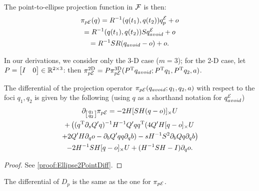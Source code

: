 \documentclass[10pt,twocolumn,twoside]{IEEEtran}
\begin{document}


The point-to-ellipse projection function in $\mathcal{F}$ is then:
  \begin{multline}\label{equ:Point2EllipseProjection}
    \pi_{p\mathcal{E}}(q)= R^{-1}(q(t_1),q(t_2))q^{\mathcal{E}}_p+o \\
    = R^{-1}(q(t_1),q(t_2))Sq^{\mathcal{E}}_{avoid}+o\\
    = R^{-1}S R ( q_{avoid}- o)+o.
  \end{multline}
  
In our derivations, we consider only the 3-D case ($m=3$); for the 2-D case, let $P=\begin{bmatrix}I & 0\end{bmatrix}\in\mathbb{R}^{2\times 3}{}$: then $\pi_{p\mathcal{E}}^{\textrm{2D}}=P\pi_{p\mathcal{E}}^{\textrm{3D}}(P^\mathrm{T} q_{avoid}; P^\mathrm{T} q_1, P^\mathrm{T} q_2,a)$.

  \begin{proposition}\label{prop:Ellipse2PointDiff}
    The differential of the projection operator $\pi_{p\mathcal{E}}(q_{avoid}; q_1,q_2,a)$ with respect to the foci $q_1,q_2$ is given by the following (using $q$ as a shorthand notation for $q^{\mathcal{E}}_{avoid}$)
    \begin{multline}
      \partial_{\left[\begin{smallmatrix}q_1\\q_2\end{smallmatrix}\right]} \pi_{p\mathcal{E}}=-2 H [ SH(q-o)]_{\times}U   \\
      + \left( (q^\mathrm{T} \partial_sQ' q)^{-1} H^{-1} Q' q q^\mathrm{T}  (4Q' H[q - o]_\times U \right. \\
      \left.+ 2Q' H\partial_q o - \partial_b Q' q q \partial_q b) -  s H^{-1} S^2 \partial_b Q q \partial_q b\right) \\
      -2H^{-1} S H[q-o]_{\times} U  + (H^{-1}SH -I)\partial_q o.
    \end{multline}
  \end{proposition}
  \begin{proof}
  See \cref{proof:Ellipse2PointDiff}.
  \end{proof}
  The differential of $D_p$ is the same as the one for $\pi_{p\mathcal{E}}$.
\end{document}
